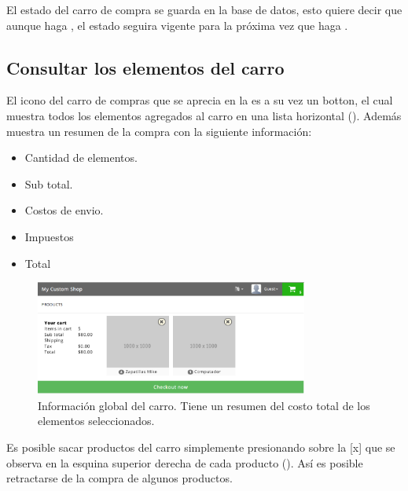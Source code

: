 		El estado del carro de compra se guarda en la base de datos, esto quiere decir que aunque haga \logoutCPT, el estado seguira vigente para la próxima vez que haga \loginUpperCPT.


	\subsection{Consultar los elementos del carro}\label{chapter:section:carro_compra:subsection:request}
		El icono del carro de compras que se aprecia en la  es a su vez un botton, el cual muestra todos los elementos agregados al carro en una lista horizontal (). Además muestra un resumen de la compra con la siguiente información:
		\begin{itemize}
			\item
				Cantidad de elementos.
			\item
				Sub total.
			\item
				Costos de envio.
			\item
				Impuestos
			\item
				Total
		\end{itemize}


		\begin{figure}[H]
			\centering
			\includegraphics[width=0.8\textwidth]{figuras/solution/cart/view.png}
			\caption{Información global del carro. Tiene un resumen del costo total de los elementos seleccionados.}
			\label{figure:solution:cart:view}
		\end{figure}

		Es posible sacar productos del carro simplemente presionando sobre la [x] que se observa en la esquina superior derecha de cada producto (). Así es posible retractarse de la compra de algunos productos.

